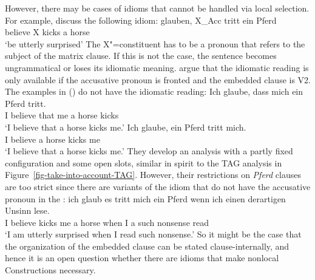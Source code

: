 \documentclass[output=paper
	        ,collection
	        ,collectionchapter
 	        ,biblatex
                ,babelshorthands
                ,newtxmath
                ,draftmode
                ,colorlinks, citecolor=brown
]{langscibook}
\begin{document}
However, there may be cases of idioms that cannot be handled via local selection.
For example,  discuss the following idiom:
\ea
\label{mich-tritt-ein-Pferd}
\gll glauben, X\_Acc tritt ein Pferd\\
     believe  X     kicks a horse\\
\glt `be utterly surprised'
\z
The X"=constituent has to be a pronoun that refers to the subject of the matrix clause. If this is not the case, the sentence becomes ungrammatical or loses its idiomatic meaning.
\eal
{}
\zl
\citet[]{RS2009a} argue that the idiomatic reading
is only available if the accusative pronoun is fronted and the embedded clause is V2. The examples
in () do not have the idiomatic reading:
\eal
\ex 
\gll Ich glaube, dass mich ein Pferd tritt.\\
     I believe   that me   a horse   kicks\\
\glt `I believe that a horse kicks me.'
\ex 
\gll Ich glaube, ein Pferd tritt mich.\\
     I believe   a horse   kicks me\\
\glt `I believe that a horse kicks me.'
\zl
They develop an analysis with a partly fixed configuration and some open slots, similar in spirit to
the TAG analysis in Figure~\ref{fig-take-into-account-TAG}. However, their restrictions on \emph{Pferd} clauses are too strict since there are
variants of the idiom that do not have the accusative pronoun in the \vf:
\ea 
\gll ich glaub es tritt mich ein Pferd wenn ich einen derartigen Unsinn lese.\footnotemark\\
     I believe \expl{} kicks me a horse when I a such nonsense read\\
\glt `I am utterly surprised when I read such nonsense.'
\z
So it might be the case that the organization of the embedded clause can be stated clause-internally,
and hence it is an open question whether there are idioms that make nonlocal Constructions necessary.
\end{document}
